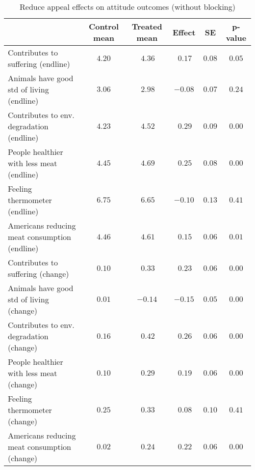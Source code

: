 \begin{table*}[ht]
\caption{Reduce appeal effects on attitude outcomes (without blocking)\label{round}} 
\begin{center}
\begin{tabular}{lccccc}
\hline\hline
\multicolumn{1}{l}{}&\multicolumn{1}{c}{Control mean}&\multicolumn{1}{c}{Treated mean}&\multicolumn{1}{c}{Effect}&\multicolumn{1}{c}{SE}&\multicolumn{1}{c}{p-value}\tabularnewline
\hline
Contributes to suffering (endline)&$4.20$&$~4.36$&$~0.17$&$0.08$&$0.05$\tabularnewline
Animals have good std of living (endline)&$3.06$&$~2.98$&$-0.08$&$0.07$&$0.24$\tabularnewline
Contributes to env. degradation (endline)&$4.23$&$~4.52$&$~0.29$&$0.09$&$0.00$\tabularnewline
People healthier with less meat (endline)&$4.45$&$~4.69$&$~0.25$&$0.08$&$0.00$\tabularnewline
Feeling thermometer (endline)&$6.75$&$~6.65$&$-0.10$&$0.13$&$0.41$\tabularnewline
Americans reducing meat consumption (endline)&$4.46$&$~4.61$&$~0.15$&$0.06$&$0.01$\tabularnewline
Contributes to suffering (change)&$0.10$&$~0.33$&$~0.23$&$0.06$&$0.00$\tabularnewline
Animals have good std of living (change)&$0.01$&$-0.14$&$-0.15$&$0.05$&$0.00$\tabularnewline
Contributes to env. degradation (change)&$0.16$&$~0.42$&$~0.26$&$0.06$&$0.00$\tabularnewline
People healthier with less meat (change)&$0.10$&$~0.29$&$~0.19$&$0.06$&$0.00$\tabularnewline
Feeling thermometer (change)&$0.25$&$~0.33$&$~0.08$&$0.10$&$0.41$\tabularnewline
Americans reducing meat consumption (change)&$0.02$&$~0.24$&$~0.22$&$0.06$&$0.00$\tabularnewline
\hline
\end{tabular}\end{center}

\end{table*}
